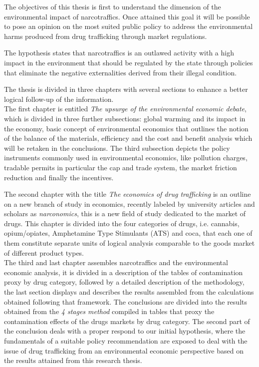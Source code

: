 The objectives of this thesis is first to understand the dimension of the environmental impact of narcotraffics. Once attained this goal it will be possible to pose an opinion on the most suited public policy to address the environmental harms produced from drug trafficking through market regulations.

The hypothesis states that narcotraffics is an outlawed activity with a high impact in the environment that should be regulated by the state through policies that eliminate the negative externalities derived from their illegal condition.

The thesis is divided in three chapters with several sections to enhance a better logical follow-up of the information. \\
The first chapter is entitled \textit{The upsurge of the environmental economic debate}, which is divided in three further subsections: global warming and its impact in the economy, basic concept of environmental economics that outlines the notion of the balance of the materials, efficiency and the cost and benefit analysis which will be retaken in the conclusions. The third subsection depicts the policy instruments commonly used in environmental economics, like pollution charges, tradable permits in particular the cap and trade system, the market friction reduction and finally the incentives.

The second chapter with the title \textit{The economics of drug trafficking} is an outline on a new branch of study in economics, recently labeled by university articles and scholars as \textit{narconomics}, this is a new field of study dedicated to the market of drugs. This chapter is divided into the four categories of drugs, i.e. cannabis, opium/opiates, Amphetamine Type Stimulants (ATS)  and coca, that each one of them constitute separate units of logical analysis comparable to the goods market of different product types.\\
The third and last chapter assembles narcotraffics and the environmental economic analysis, it is divided in a description of the tables of contamination proxy by drug category, followed by a detailed description of the methodology, the last section displays and describes the results assembled from the calculations obtained following that framework.
The conclusions are divided into the results obtained from the \textit{4 stages method} compiled in tables that proxy the contamination effects of the drugs markets by drug category. The second part of the conclusion deals with a proper respond to our initial hypothesis, where the fundamentals of a  suitable policy recommendation are exposed to deal with the issue of drug trafficking from an environmental economic perspective based on the results attained from this research thesis.
 

